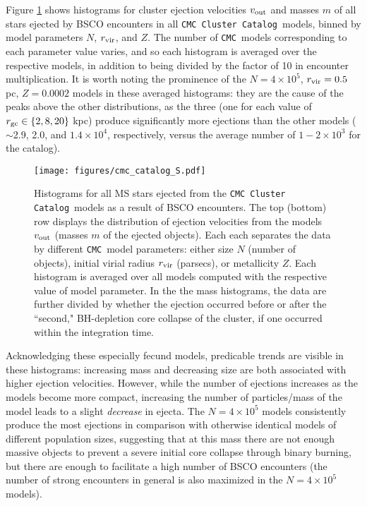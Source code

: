\documentclass[twocolumn,linenumbers]{aastex631}
\newcommand{\CMC}{\texttt{CMC}}
\newcommand{\CMCcat}{\texttt{CMC Cluster Catalog}}
\begin{document}
Figure \ref{fig:cmc_catalog} shows histograms for cluster ejection velocities $v_{\rm out}$ and masses $m$ of all stars ejected by BSCO encounters in all \CMCcat\ models, binned by model parameters $N$, $r_{\rm vir}$, and $Z$.
The number of \CMC\ models corresponding to each parameter value varies, and so each histogram is averaged over the respective models, in addition to being divided by the factor of 10 in encounter multiplication.
It is worth noting the prominence of the $N = 4\times10^5$, $r_{\rm vir} = 0.5$ pc, $Z = 0.0002$ models in these averaged histograms: they are the cause of the peaks above the other distributions, as the three (one for each value of $r_{\rm gc} \in \{2, 8, 20\}$ kpc) produce significantly more ejections than the other models ($\sim$2.9, 2.0, and $1.4 \times 10^4$, respectively, versus the average number of $1-2 \times 10^3$ for the catalog).

\begin{figure*}
    \centering
    \texttt{[image: figures/cmc\_catalog\_S.pdf]}
    \caption{
        Histograms for all MS stars ejected from the \CMCcat\ models as a result of BSCO encounters.
        The top (bottom) row displays the distribution of ejection velocities from the models $v_{\rm out}$ (masses $m$ of the ejected objects).
        Each each separates the data by different \CMC\ model parameters: either size $N$ (number of objects), initial virial radius $r_{\rm vir}$ (parsecs), or metallicity $Z$.
        Each histogram is averaged over all models computed with the respective value of model parameter.
        In the the mass histograms, the data are further divided by whether the ejection occurred before or after the ``second," BH-depletion core collapse of the cluster, if one occurred within the integration time.
    }
    \label{fig:cmc_catalog}
\end{figure*}

Acknowledging these especially fecund models, predicable trends are visible in these histograms: increasing mass and decreasing size are both associated with higher ejection velocities.
However, while the number of ejections increases as the models become more compact, increasing the number of particles/mass of the model leads to a slight \textit{decrease} in ejecta.
The $N = 4 \times 10^5$ models consistently produce the most ejections in comparison with otherwise identical models of different population sizes, suggesting that at this mass there are not enough massive objects to prevent a severe initial core collapse through binary burning, but there are enough to facilitate a high number of BSCO encounters (the number of strong encounters in general is also maximized in the $N = 4 \times 10^5$ models).
\end{document}
